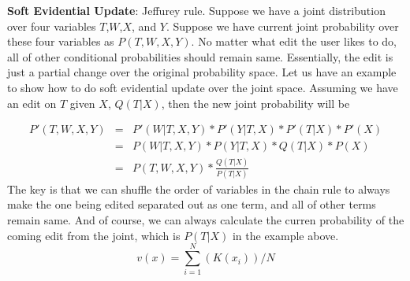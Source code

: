 \documentclass[onecolumn]{article}
\begin{document}
\textbf{Soft Evidential Update}: Jeffurey rule.
Suppose we have a joint distribution over four variables $T$,$W$,$X$, and $Y$. Suppose we have current joint probability over these four variables as $P(T,W,X,Y)$. No matter what edit the user likes to do, all of other conditional probabilities should remain same. Essentially, the edit is just a partial change over the original probability space. Let us have an example to show how to do soft evidential update over the joint space. Assuming we have an edit on $T$ given $X$, $Q(T|X)$, then the new joint probability will be 

\begin{eqnarray*}
	P'(T,W,X,Y) &=& P'(W|T,X,Y)*P'(Y|T,X)*P'(T|X)*P'(X) \\
                    &=& P(W|T,X,Y)*P(Y|T,X)*Q(T|X)*P(X)  \\
                    &=& P(T,W,X,Y) * \frac{Q(T|X)}{P(T|X)}  
\end{eqnarray*}
The key is that we can shuffle the order of variables in the chain rule to always make the one being edited separated out as one term, and all of other terms remain same. And of course, we can always calculate the curren probability of the coming edit from the joint, which is $P(T|X)$ in the example above.
\begin{equation}
    v(x) = \sum_{i=1}^{N} (K(x_i)) / N
\end{equation}





\end{document}
